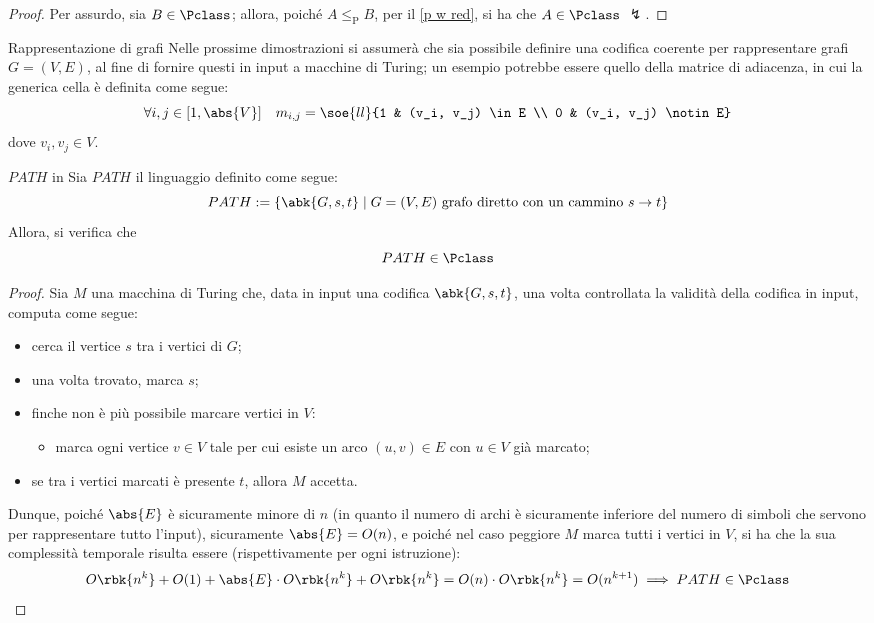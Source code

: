 \documentclass[a4paper, 12pt]{report}
\begin{document}
    \begin{proof}
        Per assurdo, sia $B \in \Pclass$; allora, poiché $A \leq_\mathrm P B$, per il \cref{p w red}, si ha che $A \in \Pclass$ $\lightning$.
    \end{proof}

    \begin{framedobs}{Rappresentazione di grafi}
        Nelle prossime dimostrazioni si assumerà che sia possibile definire una codifica coerente per rappresentare grafi $G = (V, E)$, al fine di fornire questi in input a macchine di Turing; un esempio potrebbe essere quello della matrice di adiacenza, in cui la generica cella è definita come segue: $$\forall i, j \in [1, \abs{V}] \quad m_{i, j} = \soe{ll}{1 & (v_i, v_j) \in E \\ 0 & (v_i, v_j) \notin E}$$ dove $v_i, v_j\in V$.
    \end{framedobs}

    \begin{framedthm}[label={path in p}]{$PATH$ in \Pclass}
        Sia $PATH$ il linguaggio definito come segue: $$PATH := \{\abk{G, s, t} \mid G = (V, E) \ \textrm{grafo diretto con un cammino $s \to t$}\}$$ Allora, si verifica che $$PATH \in \Pclass$$
    \end{framedthm}

    \begin{proof}
        Sia $M$ una macchina di Turing che, data in input una codifica $\abk{G, s, t}$, una volta controllata la validità della codifica in input, computa come segue:

        \begin{itemize}
            \item cerca il vertice $s$ tra i vertici di $G$;
            \item una volta trovato, marca $s$;
            \item finche non è più possibile marcare vertici in $V$:

                \begin{itemize}
                    \item marca ogni vertice $v \in V$ tale per cui esiste un arco $(u, v) \in E$ con $u \in V$ già marcato;
                \end{itemize}
            \item se tra i vertici marcati è presente $t$, allora $M$ accetta.
        \end{itemize}

        Dunque, poiché $\abs{E}$ è sicuramente minore di $n$ (in quanto il numero di archi è sicuramente inferiore del numero di simboli che servono per rappresentare tutto l'input), sicuramente $\abs{E} = O(n)$, e poiché nel caso peggiore $M$ marca tutti i vertici in $V$, si ha che la sua complessità temporale risulta essere (rispettivamente per ogni istruzione): $$O\rbk{n^k} + O(1) + \abs{E} \cdot O\rbk{n^k} + O\rbk{n^k} = O(n) \cdot O\rbk{n^k} = O(n^{k + 1}) \implies PATH \in \Pclass$$
    \end{proof}
\end{document}
